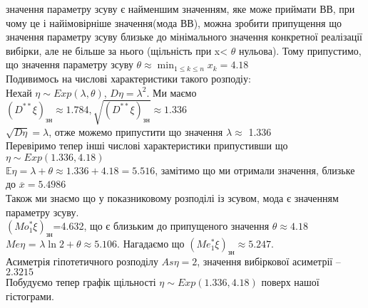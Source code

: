 \documentclass[11 pt]{article}
\begin{document}
значення параметру зсуву є найменшим значенням,
 яке може приймати ВВ, при чому це і найімовірніше значення(мода ВВ),
 можна зробити припущення що значення параметру зсуву близьке до мінімального значення
 конкретної реалізації вибірки, але не більше за нього (щільність при x< $\theta$ нульова).
 Тому припустимо, що значення параметру зсуву $\theta \approx \min_{1 \le k \le n}\limits x_k = 4.18$ \\ 
 Подивимось на числові характеристики такого розподіу: \\ 
 Нехай $ \eta \sim Exp(\lambda, \theta)$, $D \eta = \lambda^2$. Ми маємо
 $(D ^{**}\xi)_{\text{зн}} \approx 1.784, \sqrt{(D^{**}\xi)_{\text{зн}}} \approx 1.336$ \\ 
 $ \sqrt{D \eta} =  \lambda$, отже можемо припустити що значення $\lambda \approx$ 1.336  
\\ 
Перевіримо тепер інші числові характеристики припустивши що $\eta \sim Exp(1.336, 4.18)$\\ 
 $\mathbb{E} \eta = \lambda + \theta \approx 1.336+4.18 = 5.516$, 
замітимо що ми отримали значення, близьке до $\overline{x}=5.4986$  \\ 
Також ми знаємо що у показниковому розподілі із зсувом, мода є значенням параметру зсуву.\\ 
$(Mo^*_1 \xi)_{\text{зн}}$=4.632, що є близьким до припущеного значення $\theta \approx 4.18$ \\ 
$Me \eta$ = $\lambda \ln2 + \theta \approx 5.106$. Нагадаємо що
$(Me^*_1 \xi)_{\text{зн}} \approx 5.247$. \\ 
Асиметрія гіпотетичного розподілу $As \eta = 2$, значення вибіркової асиметрії -- $2.3215$\\ 
Побудуємо тепер графік щільності $\eta \sim Exp(1.336, 4.18)$ поверх нашої гістограми.
\end{document}
